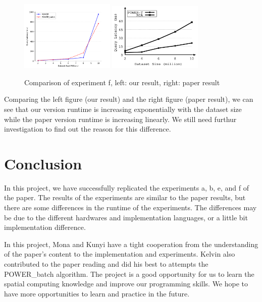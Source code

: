 \documentclass[]{IEEEphot}
\begin{document}
\begin{figure}[h]
    \centering
    \includegraphics[width=0.4\textwidth]{../exp_plots/f_2-10m_50queries_20250314-222147.png}
    \includegraphics[width=0.4\textwidth]{./pics/paper-exp-f.png}
    \caption{Comparison of experiment f, left: our result, right: paper result}
\end{figure}

Comparing the left figure (our result) and the right figure (paper result), we can see that our version runtime is increasing exponentially with the dataset size while the paper version runtime is increasing linearly. We still need furthur investigation to find out the reason for this difference.

\section{Conclusion}

In this project, we have successfully replicated the experiments a, b, e, and f of the paper. The results of the experiments are similar to the paper results, but there are some differences in the runtime of the experiments. The differences may be due to the different hardwares and implementation languages, or a little bit implementation difference.

In this project, Mona and Kunyi have a tight cooperation from the understanding of the paper's content to the implementation and experiments. Kelvin also contributed to the paper reading and did his best to attempts the POWER\_batch algorithm. The project is a good opportunity for us to learn the spatial computing knowledge and improve our programming skills. We hope to have more opportunities to learn and practice in the future.
\end{document}
